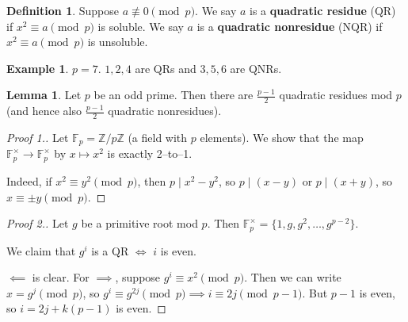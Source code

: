 \documentclass{article}
\theoremstyle{definition}
\newtheorem{lemma}[theorem]{Lemma}
\newtheorem{example}{Example}[section]
\newtheorem{defn}{Definition}[section]
\begin{document}
\begin{defn}
    Suppose $a \not\equiv 0\pmod{p}$. We say $a$ is a \textbf{quadratic residue} (QR) if $x^2 \equiv a\pmod{p}$ is soluble. We say $a$ is a \textbf{quadratic nonresidue} (NQR) if $x^2\equiv a \pmod{p}$ is unsoluble.
\end{defn}
\begin{example}
    $p=7$. $1,2,4$ are QRs and $3,5,6$ are QNRs.
\end{example}
\begin{lemma}
    Let $p$ be an odd prime. Then there are $\frac{p-1}{2}$ quadratic residues mod $p$ (and hence also $\frac{p-1}{2}$ quadratic nonresidues).
\end{lemma}
\begin{proof}[Proof 1.]
    Let $\mathbb{F}_p = \mathbb{Z}/p\mathbb{Z}$ (a field with $p$ elements). We show that the map $\mathbb{F}_p^\times \to \mathbb{F}_p^\times$ by $x \mapsto x^2$ is exactly 2--to--1. 
    
    Indeed, if $x^2 \equiv y^2 \pmod{p}$, then $p \mid x^2-y^2$, so $p \mid (x-y)$ or $p \mid (x+y)$, so $x \equiv \pm y \pmod{p}$.
\end{proof}
\begin{proof}[Proof 2.]
    Let $g$ be a primitive root mod $p$. Then $\mathbb{F}_p^\times = \{1,g,g^2,\ldots,g^{p-2}\}$.

    We claim that $g^i$ is a QR $\iff$ $i$ is even.
    \vspace{1mm}
    
    $\impliedby$ is clear. For $\implies$, suppose $g^i \equiv x^2\pmod{p}$. Then we can write $x = g^j \pmod{p}$, so $g^i \equiv g^{2j} \pmod{p} \implies i \equiv 2j \pmod{p-1}$. But $p-1$ is even, so $i = 2j + k(p-1)$ is even.
\end{proof}
\end{document}
